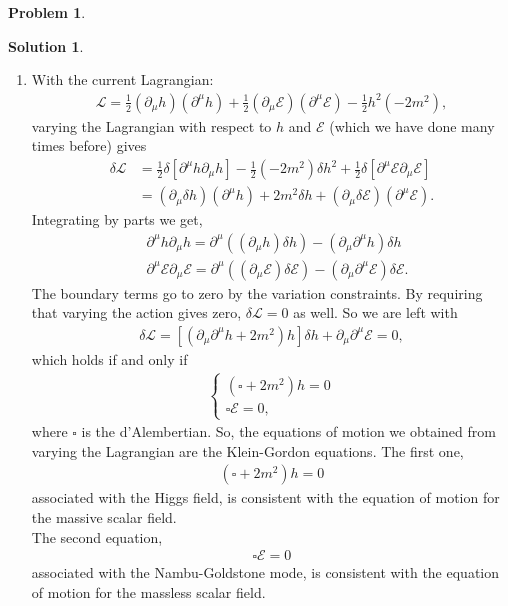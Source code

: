 \documentclass[a4paper,11pt]{article}
\numberwithin{equation}{section}
\theoremstyle{definition}
\newtheorem{prob}{Problem}[section]
\newtheorem{sln}{Solution}[section]
\newcommand{\p}{\partial}
\newcommand{\lag}{\mathcal{L}}
\newcommand{\E}{\mathcal{E}}
\begin{document}
\begin{prob}
\begin{sln}
\begin{enumerate}
			\item With the current Lagrangian:
			\begin{align}
			\lag = \frac{1}{2}\left(\p_\mu h\right)\left(\p^\mu h\right)+ \frac{1}{2}\left(\p_\mu\E\right)\left( \p^\mu\E\right) - \frac{1}{2}h^2(-2m^2),
			\end{align}
			varying the Lagrangian with respect to $h$ and $\E$ (which we have done many times before) gives
			\begin{align}
			\delta \lag &= \frac{1}{2}\delta\left[\p^\mu h\p_\mu h\right] - \frac{1}{2}(-2m^2)\delta h^2 + \frac{1}{2}\delta\left[\p^\mu\E \p_\mu \E\right]\nonumber\\
			&= (\p_\mu \delta h)(\p^\mu h) + 2m^2\delta h + (\p_\mu \delta \E )(\p^\mu \E).
			\end{align}
			Integrating by parts we get,
			\begin{align}
			&\p^\mu h \p_\mu h = \p^\mu \left((\p_\mu h)\delta h\right) - \left(\p_\mu\p^\mu h\right)\delta h\\
			&\p^\mu \E \p_\mu \E = \p^\mu \left((\p_\mu \E)\delta \E\right) - \left(\p_\mu\p^\mu \E\right)\delta \E.
			\end{align}
			The boundary terms go to zero by the variation constraints. By requiring that varying the action gives zero, $\delta \lag = 0$ as well. So we are left with
			\begin{align}
			\delta \lag = \left[(\p_\mu\p^\mu h + 2m^2)h\right]\delta h  + \p_\mu \p^\mu \E = 0,
			\end{align}
			which holds if and only if 
			\begin{align}
			\begin{cases}
			(\square + 2m^2)h = 0\\
			\square \E = 0,
			\end{cases}
			\end{align}
			where $\square$ is the d'Alembertian. So, the equations of motion we obtained from varying the Lagrangian are the Klein-Gordon equations. The first one,
			\begin{align}
			\boxed{\left(\square + 2m^2\right)h = 0}
			\end{align}
			associated with the Higgs field, is consistent with the equation of motion for the massive scalar field.\\
			
			The second equation,
			\begin{align}
			\boxed{\square \E = 0}
			\end{align}
			associated with the Nambu-Goldstone mode, is consistent with the equation of motion for the massless scalar field. \\
		\end{enumerate}
	\end{sln}
\end{prob}
\end{document}
